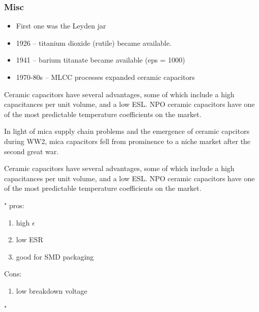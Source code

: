     \subsubsection{Misc}

        \begin{itemize}
            \item First one was the Leyden jar
            \item 1926 -- titanium dioxide (rutile) became available.
            \item 1941 -- barium titanate became available (eps = 1000)
            \item 1970-80s -- MLCC processes expanded ceramic capacitors \cite{deis_hist}
        \end{itemize}

        Ceramic capacitors have several advantages, some of which include a high capacitances per unit volume, and a low ESL. NPO ceramic capacitors have one of the most predictable temperature coefficients on the market. \cite{learn_caps}

        In light of mica supply chain problems and the emergence of ceramic capcitors during WW2, mica capacitors fell from prominence to a niche market after the second great war.\cite[Ch 3, Sec II]{cerMaterials}

        Ceramic capacitors have several advantages, some of which include a high capacitances per unit volume, and a low ESL. NPO ceramic capacitors have one of the most predictable temperature coefficients on the market. \cite{learn_caps}

        "
        pros:
        \begin{enumerate}
        \item high $\epsilon$
        \item low ESR
        \item good for SMD packaging
        \end{enumerate}

        Cons:
        \begin{enumerate}
        \item low breakdown voltage
        \end{enumerate}
        " \cite{capSite_intro}
        
